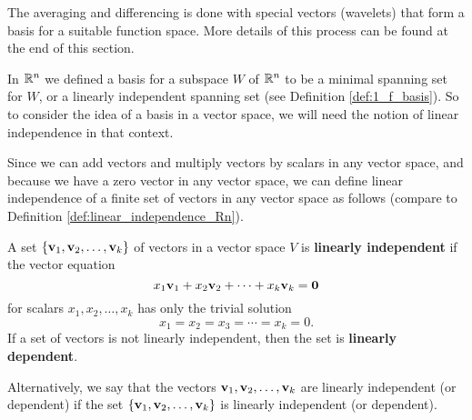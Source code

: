 The averaging and differencing is done with special vectors (wavelets) that form a basis for a suitable function space. More details of this process can be found at the end of this section. 


\label{sec:bases_intro}

In $\mathbb{R}^n$ we defined a basis for a subspace $W$ of $\mathbb{R}^n$ to be a minimal spanning set for $W$, or a linearly independent spanning set (see Definition \ref{def:1_f_basis}). So to consider the idea of a basis in a vector space, we will need the notion of linear independence in that context. 

Since we can add vectors and multiply vectors by scalars in any vector space, and because we have a zero vector in any vector space, we can define linear independence of a finite set of vectors in any vector space as follows (compare to Definition \ref{def:linear_independence_Rn}). 


\begin{definition} \label{def:vs_linear_independence} A set $\{\mathbf{v}_1, \mathbf{v}_2, \ldots, \mathbf{v}_k\}$ of vectors in a vector space $V$ is \textbf{linearly independent} if the vector equation
\[x_1 \mathbf{v}_1 + x_2 \mathbf{v}_2 + \cdots + x_k \mathbf{v}_k = \mathbf{0}\]
for scalars $x_1, x_2, \ldots, x_k$ has only the trivial solution
\[x_1 = x_2 = x_3 = \cdots = x_k = 0.\]
If a set of vectors is not linearly independent, then the set is \textbf{linearly dependent}.
\end{definition}

Alternatively, we say that the vectors $\mathbf{v}_1, \mathbf{v}_2, \ldots, \mathbf{v}_k$ are linearly independent (or dependent) if the set $\{\mathbf{v}_1, \mathbf{v}_2, \ldots, \mathbf{v}_k\}$ is linearly independent (or dependent).



